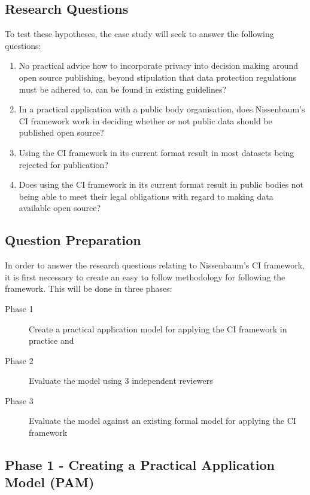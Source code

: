 \subsection {Research Questions}
To test these hypotheses, the case study will seek to answer the following questions:

\begin{enumerate}
\item No practical advice how to incorporate privacy into decision making around open source publishing, beyond stipulation that data protection regulations must be adhered to, can be found in existing guidelines?
\item In a practical application with a public body organisation, does Nissenbaum's CI framework work in deciding whether or not public data should be published open source?
\item Using the CI framework in its current format result in most datasets being rejected for publication? 
\item Does using the CI framework in its current format result in public bodies not being able to meet their legal obligations with regard to making data available open source?

\end{enumerate}

\subsection {Question Preparation}

In order to answer the research questions relating to Nissenbaum's CI framework, it is first necessary to create an easy to follow methodology for following the framework. This will be done in three phases:

\begin{description}

\item [Phase 1] Create a practical application model for applying the CI framework in practice and
\item [Phase 2] Evaluate the model using 3 independent reviewers
\item [Phase 3] Evaluate the model against an existing formal model for applying the CI framework
\end{description}

\subsection{Phase 1 - Creating a Practical Application Model (PAM)} 

